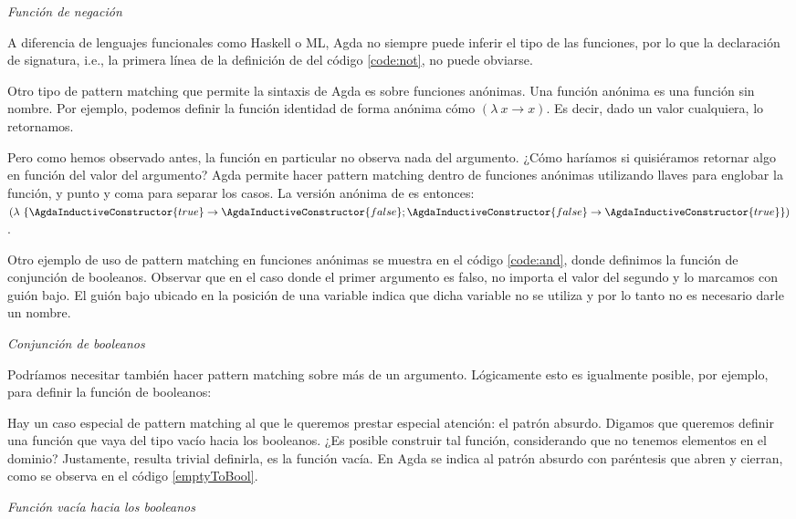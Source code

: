 \begin{agdacode}{\it Función de negación}\label{code:not}
  
\end{agdacode}

A diferencia de lenguajes funcionales como Haskell o ML, Agda no siempre puede inferir el tipo de las funciones, por lo que la declaración de signatura, i.e., la primera línea de la definición de  del código \ref{code:not}, no puede obviarse. 

Otro tipo de pattern matching que permite la sintaxis de Agda es sobre funciones anónimas. Una función anónima es una función sin nombre. Por ejemplo, podemos definir la función identidad de forma anónima cómo $(\lambda\ x \to x)$. Es decir, dado un valor cualquiera, lo retornamos.

Pero como hemos observado antes, la función  en particular no observa nada del argumento. ¿Cómo haríamos si quisiéramos retornar algo en función del valor del argumento? Agda permite hacer pattern matching dentro de funciones anónimas utilizando llaves para englobar la función, y punto y coma para separar los casos. La versión anónima de  es entonces: $(\lambda\ \{ \AgdaInductiveConstructor{true} \to \AgdaInductiveConstructor{false} ; \AgdaInductiveConstructor{false} \to \AgdaInductiveConstructor{true} \})$.

Otro ejemplo de uso de pattern matching en funciones anónimas se muestra en el código \ref{code:and}, donde definimos la función  de conjunción de booleanos. Observar que en el caso donde el primer argumento es falso, no importa el valor del segundo y lo marcamos con guión bajo. El guión bajo ubicado en la posición de una variable indica que dicha variable no se utiliza y por lo tanto no es necesario darle un nombre.  

\begin{agdacode}{\it Conjunción de booleanos}\label{code:and}
  
\end{agdacode}
Podríamos necesitar también hacer pattern matching sobre más de un argumento. Lógicamente esto es igualmente posible, por ejemplo, para definir la función  de booleanos:


Hay un caso especial de pattern matching al que le queremos prestar especial atención: el patrón absurdo. Digamos que queremos definir una función que vaya del tipo vacío hacia los booleanos. ¿Es posible construir tal función, considerando que no tenemos elementos en el dominio? Justamente, resulta trivial definirla, es la función vacía. En Agda se indica al patrón absurdo con paréntesis que abren y cierran, como se observa en el código \ref{emptyToBool}.
\begin{agdacode}{\it Función vacía hacia los booleanos}\label{emptyToBool}

\end{agdacode}

